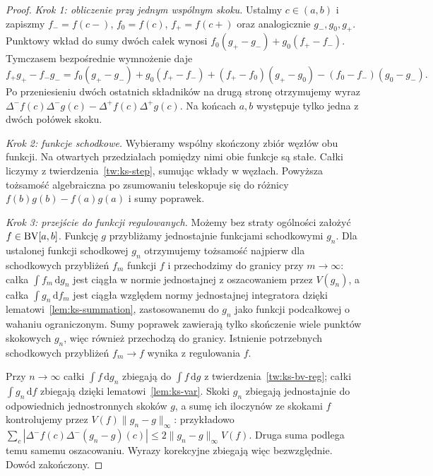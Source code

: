 \begin{proof}
\emph{Krok 1: obliczenie przy jednym wspólnym skoku.} Ustalmy $c\in(a,b)$ i zapiszmy $f_-=f(c-)$, $f_0=f(c)$, $f_+=f(c+)$ oraz analogicznie $g_-,g_0,g_+$. Punktowy wkład do sumy dwóch całek wynosi $f_0(g_+-g_-)+g_0(f_+-f_-)$. Tymczasem bezpośrednie wymnożenie daje
\[
 f_+g_+-f_-g_-=f_0(g_+-g_-)+g_0(f_+-f_-)
 +(f_+-f_0)(g_+-g_0)-(f_0-f_-)(g_0-g_-).
\]
Po przeniesieniu dwóch ostatnich składników na drugą stronę otrzymujemy wyraz $\Delta^-f(c)\Delta^-g(c)-\Delta^+f(c)\Delta^+g(c)$. Na końcach $a,b$ występuje tylko jedna z dwóch połówek skoku.

\emph{Krok 2: funkcje schodkowe.} Wybieramy wspólny skończony zbiór węzłów obu funkcji. Na otwartych przedziałach pomiędzy nimi obie funkcje są stałe. Całki liczymy z twierdzenia~\ref{tw:ks-step}, sumując wkłady w węzłach. Powyższa tożsamość algebraiczna po zsumowaniu teleskopuje się do różnicy $f(b)g(b)-f(a)g(a)$ i sumy poprawek.

\emph{Krok 3: przejście do funkcji regulowanych.} Możemy bez straty ogólności założyć $f\in\mathrm{BV}[a,b]$. Funkcję $g$ przybliżamy jednostajnie funkcjami schodkowymi $g_n$. Dla ustalonej funkcji schodkowej $g_n$ otrzymujemy tożsamość najpierw dla schodkowych przybliżeń $f_m$ funkcji $f$ i przechodzimy do granicy przy $m\to\infty$: całka $\int f_m\,\mathrm dg_n$ jest ciągła w normie jednostajnej z oszacowaniem przez $V(g_n)$, a całka $\int g_n\,\mathrm df_m$ jest ciągła względem normy jednostajnej integratora dzięki lematowi~\ref{lem:ks-summation}, zastosowanemu do $g_n$ jako funkcji podcałkowej o wahaniu ograniczonym. Sumy poprawek zawierają tylko skończenie wiele punktów skokowych $g_n$, więc również przechodzą do granicy. Istnienie potrzebnych schodkowych przybliżeń $f_m\to f$ wynika z regulowania $f$.

Przy $n\to\infty$ całki $\int f\,\mathrm dg_n$ zbiegają do $\int f\,\mathrm dg$ z twierdzenia~\ref{tw:ks-bv-reg}; całki $\int g_n\,\mathrm df$ zbiegają dzięki lematowi~\ref{lem:ks-var}. Skoki $g_n$ zbiegają jednostajnie do odpowiednich jednostronnych skoków $g$, a sumę ich iloczynów ze skokami $f$ kontrolujemy przez $V(f)\|g_n-g\|_\infty$: przykładowo $\sum_c|\Delta^-f(c)\Delta^-(g_n-g)(c)|\le2\|g_n-g\|_\infty V(f)$. Druga suma podlega temu samemu oszacowaniu. Wyrazy korekcyjne zbiegają więc bezwzględnie. Dowód zakończony.
\end{proof}

